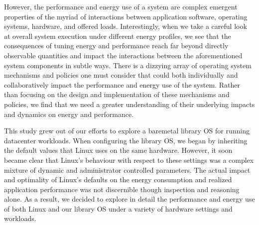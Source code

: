 However, the performance and energy use of a system are complex emergent properties of the myriad of interactions between application software, operating systems, hardware, and offered loads.
Interestingly, when we take a careful look at overall system execution under different energy profiles, we see that the consequences of tuning energy and performance reach far beyond directly observable quantities and impact the interactions between the aforementioned system components in subtle ways.
There is a dizzying array of operating system mechanisms and policies one must consider that could both individually and collaboratively impact the performance and energy use of the system.
Rather than focusing on the design and implementation of these mechanisms and policies, we find that we need a greater understanding of their underlying impacts and dynamics on energy and performance.


%
%




This study grew out of our efforts to explore a baremetal library OS for running datacenter workloads.
When configuring the library OS, we began by inheriting the default values that Linux uses on the same hardware.
However, it soon became clear that Linux's behaviour with respect to these settings was a complex mixture of dynamic and administrator controlled parameters.  
The actual impact and optimality of Linux's defaults on the energy consumption and realized application performance was not discernible though inspection and reasoning alone.
As a result, we decided to explore in detail the performance and energy use of both Linux and our library OS under a variety of hardware settings and workloads. 

